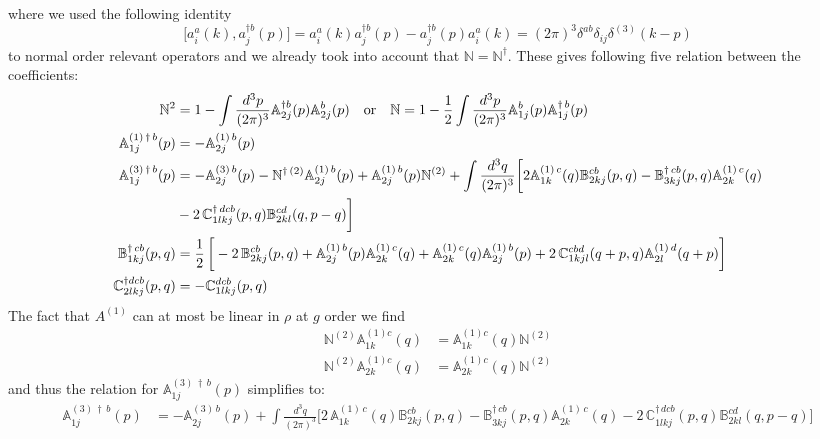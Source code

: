 \documentclass[aps,prd,amsmath,amssymb,nofootinbib]{revtex4-2}
\def\mf#1{\mathbb{#1}}
\numberwithin{equation}{section}
\begin{document}
where we used the following identity
\begin{equation}
    \bigg[a^{a}_{i}(k),a^{\dagger b}_{j}(p)\bigg] = a^{a}_{i}(k)a^{\dagger b}_{j}(p) - a^{\dagger b}_{j}(p)a^{a}_{i}(k)= (2\pi)^{3}\delta^{ab}\delta_{ij}\delta^{(3)}(k-p)
\end{equation}
to normal order relevant operators and we  already took into account that $\mf{N} = \mf{N}^\dagger  $. These gives following five relation between the coefficients: 
\begin{align}
 \mf{N}^{2}  &= 1-  \int \frac{d^{3}p}{(2\pi)^{3}} \mf{A}^{\dagger b}_{2j}(p) \mf{A}^{b}_{2j}(p) \quad
 \text{or} \quad \mf{N}   = 1- \frac{1}{2} \int \frac{d^{3}p}{(2\pi)^{3}} \mf{A}^{b}_{1j}(p) \mf{A}^{\dagger\, b}_{1j}(p) \\ 
 \mf{A}^{(1)\, \dagger\,  b}_{1j}(p) & =  -\mf{A}^{(1)\, b}_{2j}(p) \\  
 \mf{A}^{(3)\, \dagger\, b}_{1j}(p) & = -\mf{A}^{(3)\, b}_{2j}(p)- \mf{N}^{\dagger\, (2)}\mf{A}^{(1)\, b}_{2j}(p) + \mf{A}^{(1)\, b}_{2j}(p)\mf{N}^{(2)} +\int \frac{d^{3}q}{(2\pi)^{3}}\bigg[2\mf{A}^{(1)\, c}_{1k}(q)\mf{B}^{cb}_{2kj}(p,q)-\mf{B}^{\dagger\, cb}_{3kj}(p,q)\mf{A}^{(1)\,c}_{2k}(q)\notag \\ & -2\,\mf{C}^{\dagger\, dcb}_{1lkj}(p,q)\mf{B}^{cd}_{2kl}(q,p-q)\bigg] \\ 
 \mf{B}^{\dagger\, cb}_{1kj}(p,q) & = \frac{1}{2}\,\bigg[-2\,\mf{B}^{cb}_{2kj}(p,q)+\mf{A}^{(1)\, b}_{2j}(p)\mf{A}^{(1)\, c}_{2k}(q)+ \mf{A}^{(1)\, c}_{2k}(q)\mf{A}^{(1)\, b}_{2j}(p)+2\, \mf{C}^{cbd}_{1kjl}(q+p,q)\mf{A}^{(1)\,d}_{2l}(q+p)\bigg]
\\ 
  \mf{C}^{\dagger dcb}_{2lkj}(p,q) & =  -\mf{C}^{dcb}_{1lkj}(p,q)
\end{align}
The fact that $A^{(1)}$ can at most be linear in $\rho$ at $g$ order we find 
\begin{align}
    \mf {N}^{(2)}\mf{A}^{(1)c}_{1k}(q) &= \mf{A}^{(1) c}_{1k}(q) \mf {N}^{(2)} \\ 
    \mf {N}^{(2)}\mf{A}^{(1)c}_{2k}(q) &= \mf{A}^{(1) c}_{2k}(q) \mf {N}^{(2)}
\end{align}
and thus 
the relation for $\mf{A}^{(3)\, \dagger\, b}_{1j}(p)$ simplifies to:
\begin{align}
 \mf{A}^{(3)\, \dagger\, b}_{1j}(p) & = -\mf{A}^{(3)\, b}_{2j}(p) +\int \frac{d^{3}q}{(2\pi)^{3}}\bigg[2\, \mf{A}^{(1)\, c}_{1k}(q)\mf{B}^{cb}_{2kj}(p,q)-\mf{B}^{\dagger\, cb}_{3kj}(p,q)\mf{A}^{(1)\,c}_{2k}(q)-2\,\mf{C}^{\dagger\, dcb}_{1lkj}(p,q)\mf{B}^{cd}_{2kl}(q,p-q)\bigg]
 \end{align}
\end{document}
